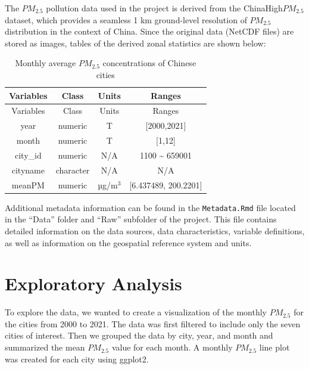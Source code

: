 \documentclass[
  12pt,
]{article}
\begin{document}
The \(PM_{2.5}\) pollution data used in the project is derived from the
ChinaHigh\(PM_{2.5}\) dataset, which provides a seamless 1 km
ground-level resolution of \(PM_{2.5}\) distribution in the context of
China. Since the original data (NetCDF files) are stored as images,
tables of the derived zonal statistics are shown below:

\begin{longtable}[]{@{}cccc@{}}
\caption{Monthly average \(PM_{2.5}\) concentrations of Chinese
cities}\tabularnewline
\toprule()
Variables & Class & Units & Ranges \\
\midrule()
\endfirsthead
\toprule()
Variables & Class & Units & Ranges \\
\midrule()
\endhead
year & numeric & T & {[}2000,2021{]} \\
month & numeric & T & {[}1,12{]} \\
city\_id & numeric & N/A & 1100 \textasciitilde{} 659001 \\
cityname & character & N/A & N/A \\
meanPM & numeric & \(µ\)g/m\(^3\) & {[}6.437489, 200.2201{]} \\
\bottomrule()
\end{longtable}

Additional metadata information can be found in the
\texttt{Metadata.Rmd} file located in the ``Data'' folder and ``Raw''
subfolder of the project. This file contains detailed information on the
data sources, data characteristics, variable definitions, as well as
information on the geospatial reference system and units.

\newpage

\hypertarget{exploratory-analysis}{%
\section{Exploratory Analysis}\label{exploratory-analysis}}

To explore the data, we wanted to create a visualization of the monthly
\(PM_{2.5}\) for the cities from 2000 to 2021. The data was first
filtered to include only the seven cities of interest. Then we grouped
the data by city, year, and month and summarized the mean \(PM_{2.5}\)
value for each month. A monthly \(PM_{2.5}\) line plot was created for
each city using ggplot2.
\end{document}
